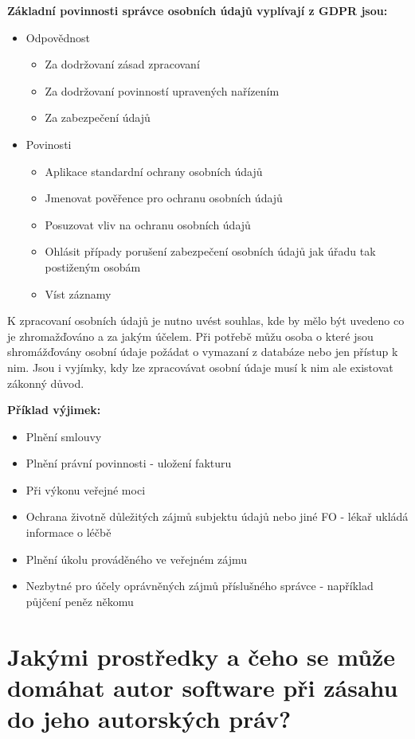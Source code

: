 \documentclass[12pt,a4paper,czech]{article}
\newcommand{\nadpis}[1]{{\section{#1}}}
\begin{document}
\vspace{0.5cm} 
\noindent\textbf{Základní povinnosti správce osobních údajů vyplívají z GDPR jsou:}
\begin{itemize}
    \item Odpovědnost
    \begin{itemize}
        \item Za dodržovaní zásad zpracovaní
        \item Za dodržovaní povinností upravených nařízením
        \item Za zabezpečení údajů
    \end{itemize}
    \item Povinosti
    \begin{itemize}
        \item Aplikace standardní ochrany osobních údajů
        \item Jmenovat pověřence pro ochranu osobních údajů
        \item Posuzovat vliv na ochranu osobních údajů
        \item Ohlásit případy porušení zabezpečení osobních údajů jak úřadu tak postiženým osobám
        \item Víst záznamy
    \end{itemize}
\end{itemize}

K zpracovaní osobních údajů je nutno uvést souhlas, kde by mělo být uvedeno co je zhromažďováno a za jakým účelem. Při potřebě můžu osoba o které jsou shromážďovány osobní údaje požádat o vymazaní z databáze nebo jen přístup k nim. Jsou i vyjímky, kdy lze zpracovávat osobní údaje musí k nim ale existovat zákonný důvod.

\newpage 
\noindent\textbf{Příklad výjimek:}
\begin{itemize}
    \item Plnění smlouvy
    \item Plnění právní povinnosti - uložení fakturu
    \item Při výkonu veřejné moci
    \item Ochrana životně důležitých zájmů subjektu údajů nebo jiné FO - lékař ukládá informace o léčbě
    \item Plnění úkolu prováděného ve veřejném zájmu
    \item Nezbytné pro účely oprávněných zájmů příslušného správce - například půjčení peněz někomu 
\end{itemize}

\vspace{0.3cm} \nadpis{Jakými prostředky a čeho se může domáhat autor software při zásahu do jeho autorských práv?}
\end{document}

